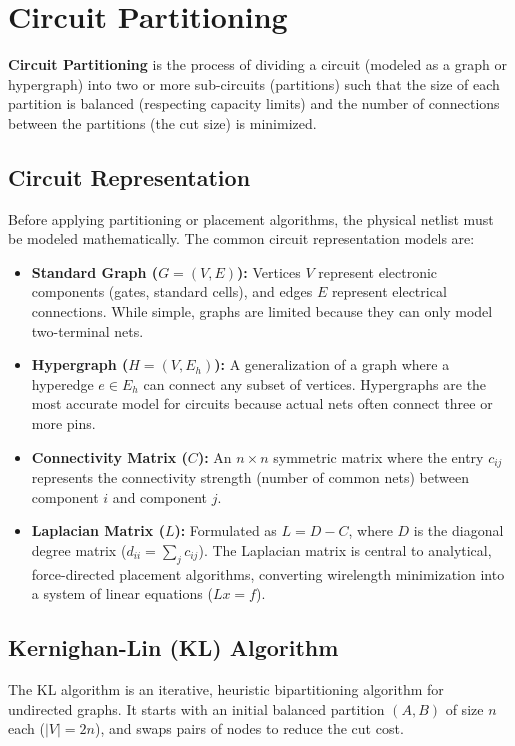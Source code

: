 \documentclass[12pt,a4paper]{article}
\begin{document}
\section{Circuit Partitioning}

\begin{tcolorbox}[defbox, title={Circuit Partitioning}]
  \textbf{Circuit Partitioning} is the process of dividing a circuit (modeled as a graph or hypergraph) into two or more sub-circuits (partitions) such that the size of each partition is balanced (respecting capacity limits) and the number of connections between the partitions (the cut size) is minimized.
\end{tcolorbox}

\subsection{Circuit Representation}
Before applying partitioning or placement algorithms, the physical netlist must be modeled mathematically. The common circuit representation models are:
\begin{itemize}[leftmargin=*, itemsep=3pt]
  \item \textbf{Standard Graph ($G = (V, E)$):} Vertices $V$ represent electronic components (gates, standard cells), and edges $E$ represent electrical connections. While simple, graphs are limited because they can only model two-terminal nets.
  \item \textbf{Hypergraph ($H = (V, E_h)$):} A generalization of a graph where a hyperedge $e \in E_h$ can connect any subset of vertices. Hypergraphs are the most accurate model for circuits because actual nets often connect three or more pins.
  \item \textbf{Connectivity Matrix ($C$):} An $n \times n$ symmetric matrix where the entry $c_{ij}$ represents the connectivity strength (number of common nets) between component $i$ and component $j$.
  \item \textbf{Laplacian Matrix ($L$):} Formulated as $L = D - C$, where $D$ is the diagonal degree matrix ($d_{ii} = \sum_j c_{ij}$). The Laplacian matrix is central to analytical, force-directed placement algorithms, converting wirelength minimization into a system of linear equations ($L x = f$).
\end{itemize}

\subsection{Kernighan-Lin (KL) Algorithm}
The KL algorithm is an iterative, heuristic bipartitioning algorithm for undirected graphs. It starts with an initial balanced partition $(A, B)$ of size $n$ each ($|V| = 2n$), and swaps pairs of nodes to reduce the cut cost.
\end{document}
